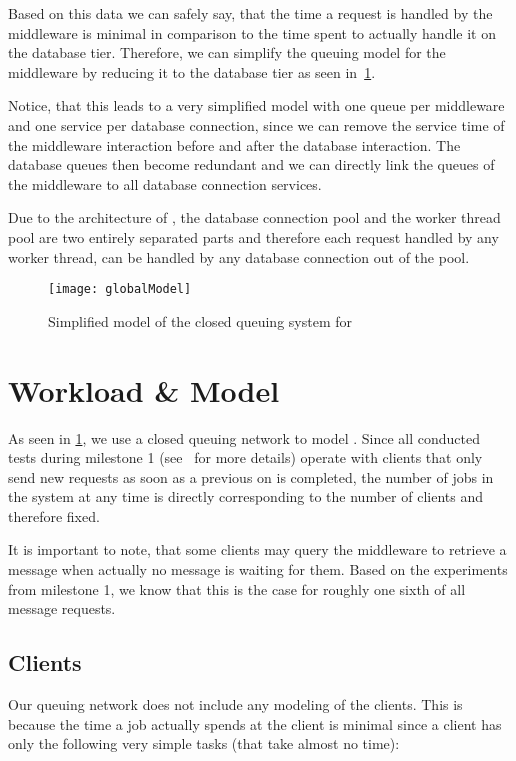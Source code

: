 \documentclass[a4paper, oneside]{csthesis}
\begin{document}
    Based on this data we can safely say, that the time a request is handled by
    the middleware is minimal in comparison to the time spent to actually handle
    it on the database tier. Therefore, we can simplify the queuing model for
    the middleware by reducing it to the database tier as seen in~\cref{fig:globalModel}.
    
    Notice, that this leads to a very simplified model with one queue per
    middleware and one service per database connection, since we can remove the
    service time of the middleware interaction before and after the database
    interaction. The database queues then become redundant and we can directly
    link the queues of the middleware to all database connection services.
    
    Due to the architecture of \telesto, the database connection pool and the
    worker thread pool are two entirely separated parts and therefore each
    request handled by any worker thread, can be handled by any database connection out
    of the pool.

    \begin{figure}[t]
        \centering
            \texttt{[image: globalModel]}
            \caption{Simplified model of the closed queuing system for \telesto}
            \label{fig:globalModel}
    \end{figure}

\section{Workload \& Model}
    As seen in \cref{fig:globalModel}, we use a closed queuing network to model
    \telesto. Since all conducted tests during milestone 1
    (see~\cite{asl:telesto} for more details) operate with clients that only
    send new requests as soon as a previous on is completed, the number of jobs
    in the system at any time is directly corresponding to the number of clients
    and therefore fixed.
    
    It is important to note, that some clients may query the middleware to
    retrieve a message when actually no message is waiting for them. Based on
    the experiments from milestone 1, we know that this is the case for roughly
    one sixth of all message requests.

\subsection{Clients}
    Our queuing network does not include any modeling of the clients. This is
    because the time a job actually spends at the client is minimal since a
    client has only the following very simple tasks (that take almost no time):
    
\end{document}
